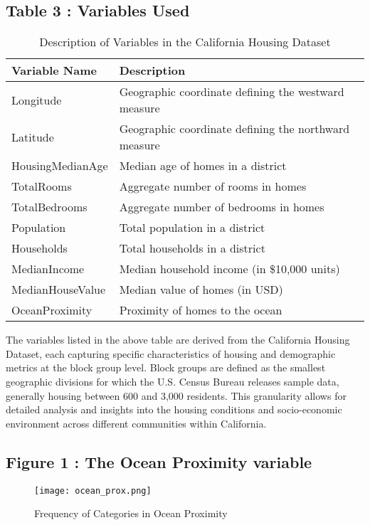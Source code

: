 \documentclass[12pt]{article}
\begin{document}
\subsection{Table 3 : Variables Used}
\begin{table}[H] %
	\centering
	\begin{tabular}{ll}
		\toprule
		\textbf{Variable Name} & \textbf{Description} \\
		\midrule
		Longitude & Geographic coordinate defining the westward measure \\
		Latitude & Geographic coordinate defining the northward measure \\
		HousingMedianAge & Median age of homes in a district \\
		TotalRooms & Aggregate number of rooms in homes \\
		TotalBedrooms & Aggregate number of bedrooms in homes \\
		Population & Total population in a district \\
		Households & Total households in a district \\
		MedianIncome & Median household income (in \$10,000 units) \\
		MedianHouseValue & Median value of homes (in USD) \\
		OceanProximity & Proximity of homes to the ocean \\
		\bottomrule
	\end{tabular}
	\caption{Description of Variables in the California Housing Dataset}
	\label{tab:variables}
\end{table}
The variables listed in the above table are derived from the California Housing Dataset, each capturing specific characteristics of housing and demographic metrics at the block group level. 
Block groups are defined as the smallest geographic divisions for which the U.S. Census Bureau releases sample data, generally housing between 600 and 3,000 residents. This granularity allows for detailed analysis and insights into the housing conditions and socio-economic environment across different communities within California.


\subsection{Figure 1 : The Ocean Proximity variable}
\begin{figure}[H]
	\centering
	\texttt{[image: ocean\_prox.png]}
	\caption{Frequency of Categories in Ocean Proximity}
	\label{fig:oceanprox}
\end{figure}
\end{document}
